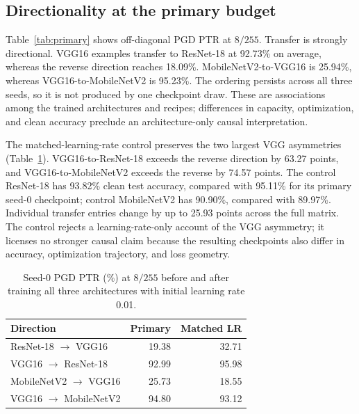 \documentclass[10pt]{article}
\begin{document}
\subsection{Directionality at the primary budget}
Table~\ref{tab:primary} shows off-diagonal PGD PTR at $8/255$. Transfer is strongly directional. VGG16 examples transfer to ResNet-18 at 92.73\% on average, whereas the reverse direction reaches 18.09\%. MobileNetV2-to-VGG16 is 25.94\%, whereas VGG16-to-MobileNetV2 is 95.23\%. The ordering persists across all three seeds, so it is not produced by one checkpoint draw. These are associations among the trained architectures and recipes; differences in capacity, optimization, and clean accuracy preclude an architecture-only causal interpretation.

\begin{table}[t]
\centering
\caption{PGD PTR (\%) at $8/255$, reported as mean [minimum, maximum] over three training seeds.}
\label{tab:primary}
\end{table}

The matched-learning-rate control preserves the two largest VGG asymmetries (Table~\ref{tab:lrcontrol}). VGG16-to-ResNet-18 exceeds the reverse direction by 63.27 points, and VGG16-to-MobileNetV2 exceeds the reverse by 74.57 points. The control ResNet-18 has 93.82\% clean test accuracy, compared with 95.11\% for its primary seed-0 checkpoint; control MobileNetV2 has 90.90\%, compared with 89.97\%. Individual transfer entries change by up to 25.93 points across the full matrix. The control rejects a learning-rate-only account of the VGG asymmetry; it licenses no stronger causal claim because the resulting checkpoints also differ in accuracy, optimization trajectory, and loss geometry.

\begin{table}[t]
\centering
\caption{Seed-0 PGD PTR (\%) at $8/255$ before and after training all three architectures with initial learning rate 0.01.}
\label{tab:lrcontrol}
\begin{tabular}{lrr}
\toprule
Direction & Primary & Matched LR\\
\midrule
ResNet-18 $\rightarrow$ VGG16 & 19.38 & 32.71\\
VGG16 $\rightarrow$ ResNet-18 & 92.99 & 95.98\\
MobileNetV2 $\rightarrow$ VGG16 & 25.73 & 18.55\\
VGG16 $\rightarrow$ MobileNetV2 & 94.80 & 93.12\\
\bottomrule
\end{tabular}
\end{table}
\end{document}

